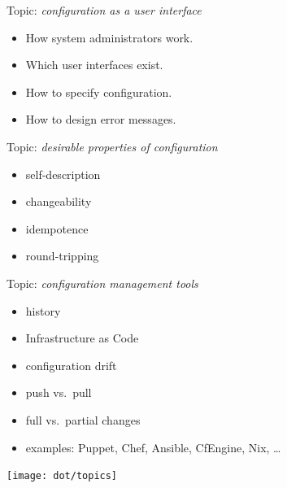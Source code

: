 \begin{frame}
	Topic: \textit{configuration as a user interface}
	\begin{itemize}
		\item How system administrators work.
		\item Which user interfaces exist.
		\item How to specify configuration.
		\item How to design error messages.
	\end{itemize}
\end{frame}

\begin{frame}
	Topic: \textit{desirable properties of configuration}
	\begin{itemize}
		\item self-description
		\item changeability
		\item idempotence
		\item round-tripping
	\end{itemize}
\end{frame}

\begin{frame}
	Topic: \textit{configuration management tools}
	\begin{itemize}
		\item history
		\item Infrastructure as Code
		\item configuration drift
		\item push vs.\ pull
		\item full vs.\ partial changes
		\item examples: Puppet, Chef, Ansible, CfEngine, Nix, \dots
	\end{itemize}
\end{frame}


\begin{frame}
	\hspace*{-1cm}\texttt{[image: dot/topics]}
\end{frame}


